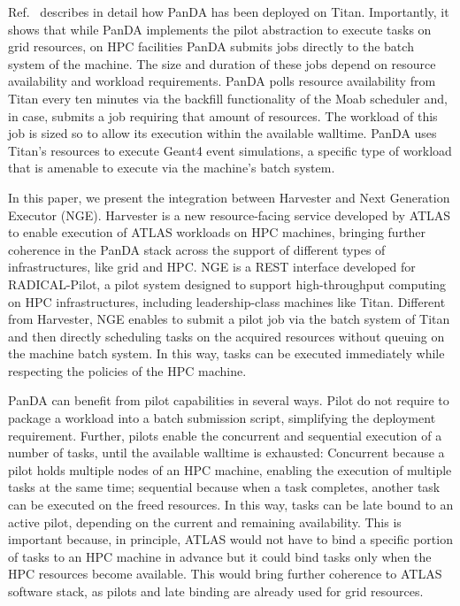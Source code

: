 \documentclass{webofc}
\begin{document}
Ref.~\cite{Doleynik2017high} describes in detail how PanDA has been deployed
on Titan. Importantly, it shows that while PanDA implements the pilot
abstraction to execute tasks on grid resources, on HPC facilities PanDA
submits jobs directly to the batch system of the machine. The size and
duration of these jobs depend on resource availability and workload
requirements. PanDA polls resource availability from Titan every ten minutes
via the backfill functionality of the Moab scheduler and, in case, submits a
job requiring that amount of resources. The workload of this job is sized so
to allow its execution within the available walltime. PanDA uses Titan’s
resources to execute Geant4 event simulations, a specific type of workload
that is amenable to execute via the machine’s batch system.

In this paper, we present the integration between Harvester and Next
Generation Executor (NGE). Harvester is a new resource-facing service
developed by ATLAS to enable execution of ATLAS workloads on HPC machines,
bringing further coherence in the PanDA stack across the support of different
types of infrastructures, like grid and HPC. NGE is a REST interface
developed for RADICAL-Pilot, a pilot system designed to support
high-throughput computing on HPC infrastructures, including leadership-class
machines like Titan. Different from Harvester, NGE enables to submit a pilot
job via the batch system of Titan and then directly scheduling tasks on the
acquired resources without queuing on the machine batch system. In this way,
tasks can be executed immediately while respecting the policies of the HPC
machine.

PanDA can benefit from pilot capabilities in several ways. Pilot do not
require to package a workload into a batch submission script, simplifying the
deployment requirement. Further, pilots enable the concurrent and sequential
execution of a number of tasks, until the available walltime is exhausted:
Concurrent because a pilot holds multiple nodes of an HPC machine, enabling
the execution of multiple tasks at the same time; sequential because when a
task completes, another task can be executed on the freed resources. In this
way, tasks can be late bound to an active pilot, depending on the current and
remaining availability. This is important because, in principle, ATLAS would
not have to bind a specific portion of tasks to an HPC machine in advance but
it could bind tasks only when the HPC resources become available. This would
bring further coherence to ATLAS software stack, as pilots and late binding
are already used for grid resources.
\end{document}
